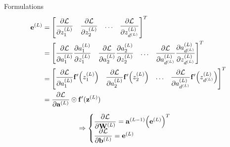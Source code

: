 \documentclass[10pt]{beamer}
\theoremstyle{remark}
\theoremstyle{definition}
\begin{document}
\begin{frame}[allowframebreaks]{Formulations}
	\begin{equation}
		\begin{aligned}
			\bold{e}^{(L)}&=\begin{bmatrix} \dfrac{\partial\mathcal{L}}{\partial z_1^{(L)}} & \dfrac{\partial\mathcal{L}}{\partial z_2^{(L)}} & \dots & \dfrac{\partial\mathcal{L}}{\partial z_{d^{(L)}}^{(L)}} \end{bmatrix}^T\\&=\begin{bmatrix} \dfrac{\partial\mathcal{L}}{\partial a_1^{(L)}}\dfrac{\partial a_1^{(L)}}{\partial z_1^{(L)}} & \dfrac{\partial\mathcal{L}}{\partial a_2^{(L)}}\dfrac{\partial a_2^{(L)}}{\partial z_2^{(L)}} & \dots & \dfrac{\partial\mathcal{L}}{\partial a_{d^{(L)}}^{(L)}}\dfrac{\partial a_{d^{(L)}}^{(L)}}{\partial z_{d^{(L)}}^{(L)}} \end{bmatrix}^T\\&=\begin{bmatrix} \dfrac{\partial\mathcal{L}}{\partial a_1^{(L)}}\bold{f}^{\prime}\Big(z_1^{(L)}\Big) & \dfrac{\partial\mathcal{L}}{\partial a_2^{(L)}}\bold{f}^{\prime}\Big(z_2^{(L)}\Big) & \dots & \dfrac{\partial\mathcal{L}}{\partial a_{d^{(L)}}^{(L)}}\bold{f}^{\prime}\Big(z_{d^{(L)}}^{(L)}\Big) \end{bmatrix}^T\\&=\dfrac{\partial \mathcal{L}}{\partial \bold{a}^{(L)}} \odot \bold{f}^{\prime}(\bold{z}^{(L)})
		\end{aligned}
	\end{equation}

	\begin{equation}
		\Rightarrow \begin{cases}\dfrac{\partial \mathcal{L}}{\partial \bold{W}^{(L)}}=\bold{a}^{(L-1)}\Big(\bold{e}^{(L)}\Big)^T \\ \dfrac{\partial \mathcal{L}}{\partial \bold{b}^{(L)}}=\bold{e}^{(L)} \end{cases}
	\end{equation}

	\begin{figure}
		\centering
\end{figure}
\end{frame}
\end{document}
